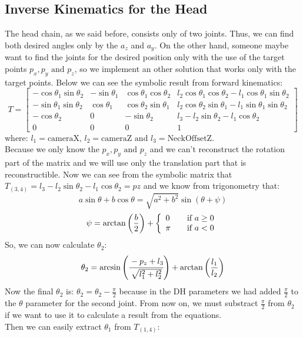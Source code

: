 \subsection{Inverse Kinematics for the Head}
The head chain, as we said before, consists only of two joints. Thus, we can find both desired angles only by the \(a_z\) and \(a_y\). On the other hand, someone maybe want to find the joints for the desired position only with the use of the target points \(p_x,p_y\text{ and }p_z\), so we implement an other solution that works only with the target points. Below we can see the symbolic result from forward kinematics:
\[
T = 
\begin{bmatrix}
-\cos\theta_1\sin\theta_2 & -\sin\theta_1 & \cos\theta_1\cos\theta_2 &  l_2\cos\theta_1\cos\theta_2 - l_1\cos\theta_1\sin\theta_2\\
-\sin\theta_1\sin\theta_2 & \cos\theta_1 & \cos\theta_2\sin\theta_1 & l_2\cos\theta_2\sin\theta_1 - l_1\sin\theta_1\sin\theta_2\\
-\cos\theta_2 & 0 & -\sin\theta_2 & l_3 - l_2\sin\theta_2 - l_1\cos\theta_2\\
0 & 0 & 0 & 1
\end{bmatrix}
\]
where: \(l_1 = \text{cameraX, }l_2 = \text{cameraZ and }l_3 = \text{NeckOffsetZ}\).\\
Because we only know the \(p_x,p_y\text{ and }p_z\) and we can't reconstruct the rotation part of the matrix and we will use only the translation part that is reconstructible. Now we can see from the symbolic matrix that \(T_{(3,4)} = l_3 - l_2\sin\theta_2 - l_1\cos\theta_2 = pz\) and we know from trigonometry that: 
\[
a\sin\theta + b\cos\theta = \sqrt{a^2+b^2}\sin\left(\theta + \psi\right)
\]
\[
\psi=\arctan\left(\frac{b}{2}\right) + \left\{ 
  \begin{array}{l l}
    0 & \quad \text{if }a\geq0\\
    \pi & \quad \text{if }a<0\\
  \end{array} \right.
\]
So, we can now calculate \(\theta_2\):
\[
\theta_2 = \arcsin\left(\cfrac{-p_z+l_3}{\sqrt{l_1^2+l_2^2}}\right) + \arctan\left(\frac{l_1}{l_2}\right)
\]
Now the final \(\theta_2\) is: \(\theta_2 = \theta_2 - \frac{\pi}{2}\) because in the DH parameters we had added \(\frac{\pi}{2}\) to the \(\theta\) parameter for the second joint.  From now on, we must substract \(\frac{\pi}{2}\) from \(\theta_2\) if we want to use it to calculate a result from the equations.\\
Then we can easily extract \(\theta_1\) from \(T_{(1,4)}\):
